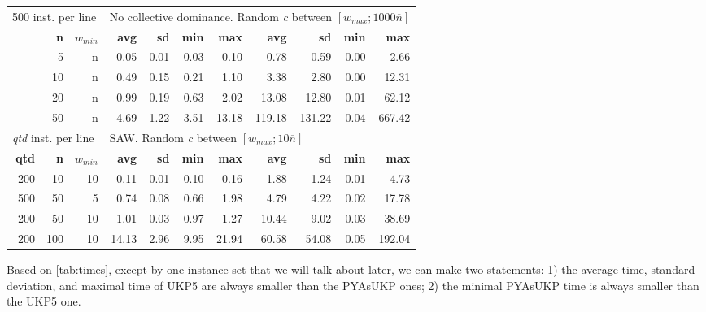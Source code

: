 \documentclass[runningheads,a4paper]{llncs}
\begin{document}
\begin{table}
\begin{tabular}{@{\extracolsep{4pt}}rrrrrrrrrrr@{}}
\multicolumn{3}{l}{500 inst. per line} & \multicolumn{8}{l}{No collective dominance. Random \emph{c} between \([w_{max}; 1000\overline{n}]\)}\\
\cline{1-3}\cline{4-11}
& \textbf{n} & \(w_{min}\) & \textbf{avg} & \textbf{sd} & \textbf{min} & \textbf{max} & \textbf{avg} & \textbf{sd} & \textbf{min} & \textbf{max}\\
\cline{1-3}\cline{4-7}\cline{8-11}
&  5 & n & 0.05 & 0.01 & 0.03 & 0.10 & 0.78 & 0.59 & 0.00 & 2.66\\
& 10 & n & 0.49 & 0.15 & 0.21 & 1.10 & 3.38 & 2.80 & 0.00 & 12.31\\
& 20 & n & 0.99 & 0.19 & 0.63 & 2.02 & 13.08 & 12.80 & 0.01 & 62.12\\
& 50 & n & 4.69 & 1.22 & 3.51 & 13.18 & 119.18 & 131.22 & 0.04 & 667.42\\
\hline

\multicolumn{3}{l}{\emph{qtd} inst. per line} & \multicolumn{8}{l}{SAW. Random \emph{c} between \([w_{max}; 10\overline{n}]\)}\\
\cline{1-3}\cline{4-11}
\textbf{qtd} & \textbf{n} & \(w_{min}\) & \textbf{avg} & \textbf{sd} & \textbf{min} & \textbf{max} & \textbf{avg} & \textbf{sd} & \textbf{min} & \textbf{max}\\
\cline{1-3}\cline{4-7}\cline{8-11}
~200 &  10 & 10 & 0.11 & 0.01 & 0.10 & 0.16 & 1.88 & 1.24 & 0.01 & 4.73\\
~500 &  50 &  5 & 0.74 & 0.08 & 0.66 & 1.98 & 4.79 & 4.22 & 0.02 & 17.78\\
~200 &  50 & 10 & 1.01 & 0.03 & 0.97 & 1.27 & 10.44 & 9.02 & 0.03 & 38.69\\
~200 & 100 & 10 & 14.13 & 2.96 & 9.95 & 21.94 & 60.58 & 54.08 & 0.05 & 192.04\\
\hline

\end{tabular}
\end{table}
Based on \ref{tab:times}, except by one instance set that we will talk about later, we can make two statements: 1) the average time, standard deviation, and maximal time of UKP5 are always smaller than the PYAsUKP ones; 2) the minimal PYAsUKP time is always smaller than the UKP5 one.
\end{document}

